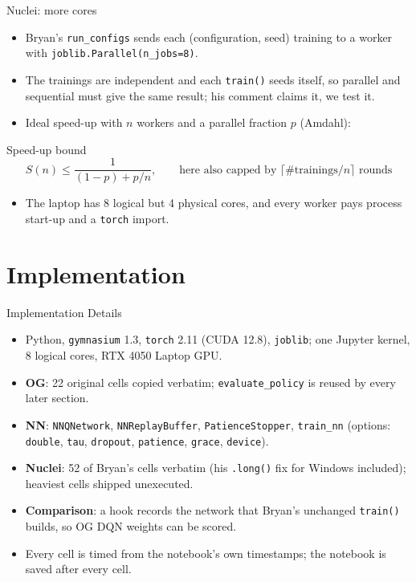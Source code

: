 \documentclass[aspectratio=169]{beamer}
\begin{document}
\begin{frame}{Nuclei: more cores}
\begin{itemize}
  \item Bryan's \texttt{run\_configs} sends each (configuration, seed) training to a worker with \texttt{joblib.Parallel(n\_jobs=8)}.
  \item The trainings are independent and each \texttt{train()} seeds itself, so \alert{parallel and sequential must give the same result}; his comment claims it, we test it.
  \item Ideal speed-up with $n$ workers and a parallel fraction $p$ (Amdahl):
\end{itemize}
\begin{block}{Speed-up bound}
\[
S(n)\le\frac{1}{(1-p)+p/n},\qquad \text{here also capped by } \lceil \#\text{trainings}/n\rceil \text{ rounds}
\]
\end{block}
\begin{itemize}
  \item The laptop has 8 logical but 4 physical cores, and every worker pays process start-up and a \texttt{torch} import.
\end{itemize}
\end{frame}

\section{Implementation}

\begin{frame}{Implementation Details}
\begin{itemize}
  \item Python, \texttt{gymnasium} 1.3, \texttt{torch} 2.11 (CUDA 12.8), \texttt{joblib}; one Jupyter kernel, 8 logical cores, RTX 4050 Laptop GPU.
  \item \textbf{OG}: 22 original cells copied verbatim; \texttt{evaluate\_policy} is reused by every later section.
  \item \textbf{NN}: \texttt{NNQNetwork}, \texttt{NNReplayBuffer}, \texttt{PatienceStopper}, \texttt{train\_nn} (options: \texttt{double}, \texttt{tau}, \texttt{dropout}, \texttt{patience}, \texttt{grace}, \texttt{device}).
  \item \textbf{Nuclei}: 52 of Bryan's cells verbatim (his \texttt{.long()} fix for Windows included); heaviest cells shipped unexecuted.
  \item \textbf{Comparison}: a hook records the network that Bryan's unchanged \texttt{train()} builds, so OG DQN weights can be scored.
  \item Every cell is timed from the notebook's own timestamps; the notebook is saved after every cell.
\end{itemize}
\end{frame}
\end{document}
